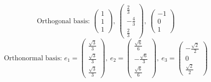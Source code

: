 \[ \text{Orthogonal basis: }\begin{pmatrix}1 \\ 1 \\ 1\end{pmatrix},\ \begin{pmatrix}\frac{2}{3} \\ - \frac{4}{3} \\ \frac{2}{3}\end{pmatrix},\ \begin{pmatrix}-1 \\ 0 \\ 1\end{pmatrix} \]
\[ \text{Orthonormal basis: }e_1=\begin{pmatrix}\frac{\sqrt{3}}{3} \\ \frac{\sqrt{3}}{3} \\ \frac{\sqrt{3}}{3}\end{pmatrix},\ e_2=\begin{pmatrix}\frac{\sqrt{6}}{6} \\ - \frac{\sqrt{6}}{3} \\ \frac{\sqrt{6}}{6}\end{pmatrix},\ e_3=\begin{pmatrix}- \frac{\sqrt{2}}{2} \\ 0 \\ \frac{\sqrt{2}}{2}\end{pmatrix} \]

